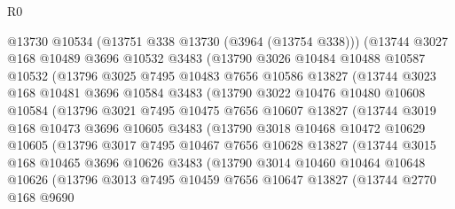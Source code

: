 \begin{lexlean}{R0}
\begin{coremodule}
          @13730
          @10534
          (@13751 @338 @13730 (@3964 (@13754 @338)))
          (@13744
            @3027
            @168
            @10489
            @3696
            @10532
            @3483
            (@13790
              @3026
              @10484
              @10488
              @10587
              @10532
              (@13796
                @3025
                @7495
                @10483
                @7656
                @10586
                @13827
                (@13744
                  @3023
                  @168
                  @10481
                  @3696
                  @10584
                  @3483
                  (@13790
                    @3022
                    @10476
                    @10480
                    @10608
                    @10584
                    (@13796
                      @3021
                      @7495
                      @10475
                      @7656
                      @10607
                      @13827
                      (@13744
                        @3019
                        @168
                        @10473
                        @3696
                        @10605
                        @3483
                        (@13790
                          @3018
                          @10468
                          @10472
                          @10629
                          @10605
                          (@13796
                            @3017
                            @7495
                            @10467
                            @7656
                            @10628
                            @13827
                            (@13744
                              @3015
                              @168
                              @10465
                              @3696
                              @10626
                              @3483
                              (@13790
                                @3014
                                @10460
                                @10464
                                @10648
                                @10626
                                (@13796
                                  @3013
                                  @7495
                                  @10459
                                  @7656
                                  @10647
                                  @13827
                                  (@13744
                                    @2770
                                    @168
                                    @9690

\end{coremodule}
\end{lexlean}

